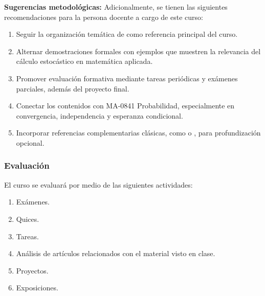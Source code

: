 \begin{refsection}
\textbf{Sugerencias metodológicas:} Adicionalmente, se tienen las siguientes recomendaciones para la persona docente a cargo de este curso:

\begin{enumerate}
    \item Seguir la organización temática de \cite{LeG16} como referencia principal del curso.
    \item Alternar demostraciones formales con ejemplos que muestren la relevancia del cálculo estocástico en matemática aplicada.
    \item Promover evaluación formativa mediante tareas periódicas y exámenes parciales, además del proyecto final.
    \item Conectar los contenidos con MA-0841 Probabilidad, especialmente en convergencia, independencia y esperanza condicional.
    \item Incorporar referencias complementarias clásicas, como \cite{KS91} o \cite{RY99}, para profundización opcional.
\end{enumerate}

\subsubsection*{Evaluación}

El curso se evaluará por medio de las siguientes actividades:

\begin{enumerate}
\item Exámenes.
\item Quices.
\item Tareas.
\item Análisis de artículos relacionados con el material visto en clase.
\item Proyectos.
\item Exposiciones.
\end{enumerate}

\nocite{LeG16}
\nocite{KS91}
\nocite{RY99}
\nocite{Oks03}

\printcursosbibliography
\end{refsection}
